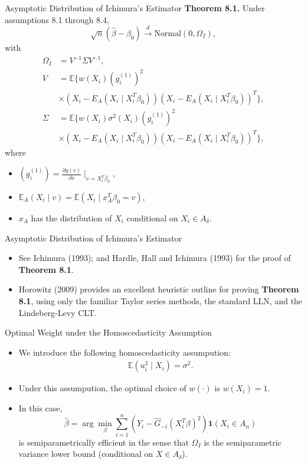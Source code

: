 \documentclass[xcolor=svgnames,dvipdfmx,cjk]{beamer}
\theoremstyle{example}
\def\E{\mathbb{E}}
\def\darrow{\xrightarrow{d}}
\begin{document}
  \begin{frame}{Asymptotic Distribution of Ichimura's Estimator}
  \textbf{Theorem 8.1.} Under assumptions 8.1 through 8.4,
      \[ \sqrt{n}(\hat{\beta} - \beta_0)
        \darrow \text{Normal} (0, \Omega_I),
      \]
  with
    \begin{align*}
      \Omega_I &= V^{-1} \Sigma V^{-1}, \\
      V &= \E\{
        w(X_i) (g_i^{(1)})^2 \\
        & \times (X_i - E_A(X_i\mid X_i^T \beta_0)) (X_i - E_A(X_i\mid X_i^T \beta_0))^T 
      \}, \\
      \Sigma &= \E \{
        w(X_i) \sigma^2(X_i) (g_i^{(1)})^2 \\
        & \times (X_i - E_A(X_i\mid X_i^T \beta_0)) (X_i - E_A(X_i\mid X_i^T \beta_0))^T 
      \},
    \end{align*}
    where
    \begin{itemize}
      \item $(g_i^{(1)}) = \frac{\partial g(v)}{\partial v}\mid_{v= X_i^T \beta_0}$,
      \item $\E_A (X_i\mid v) = \E(X_i \mid x_A^T\beta_0 = v)$,
      \item $x_A$ has the distribution of $X_i$ conditional on $X_i \in A_\delta$.
    \end{itemize}
  \end{frame}
  
  \begin{frame}{Asymptotic Distribution of Ichimura's Estimator}
  \begin{itemize}
    \item See Ichimura (1993); and Hardle, Hall and Ichimura (1993) for the proof of \textbf{Theorem 8.1}.
    \item Horowitz (2009) provides an excellent heuristic outline for proving \textbf{Theorem 8.1}, 
          using only the familiar Taylor series methods, the standard LLN, and the Lindeberg-Levy CLT.
  \end{itemize}
  \end{frame}
  
  
  \begin{frame}{Optimal Weight under the Homoscedasticity Assumption}
  \begin{itemize}
    \item We introduce the following homoscedasticity assumpution:
          \begin{align*}
            \E(u_i^2 \mid X_i) = \sigma^2.
          \end{align*}
    \item Under this assumpution, the optimal choice of $w(\cdot)$ is $w(X_i)=1$.
    \item In this case, 
          \[ \hat{\beta} = \arg\min_{\beta} \sum_{i=1}^{n} (Y_i - \hat{G}_{-i}(X_i^{T}\beta)^2)\mathbf{1}(X_i \in A_n) \]
          is \alert{semiparametrically efficient} in the sense that 
          $\Omega_I$ is \alert{the semiparametric variance lower bound} (conditional on $X \in A_\delta$).
  \end{itemize}
  \end{frame}
  
\end{document}
